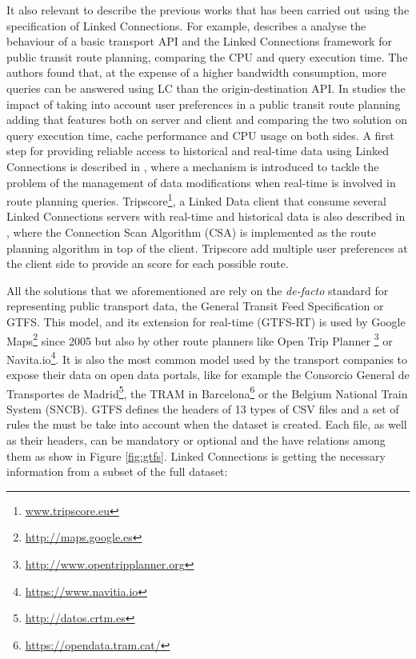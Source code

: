 \documentclass[sw]{iosart2x}
\begin{document}
It also relevant to describe the previous works that has been carried out using the specification of Linked Connections. For example, \cite{colpaert2017public} describes a analyse the behaviour of a basic transport API and the Linked Connections framework for public transit route planning, comparing the CPU and query execution time. The authors found that, at the expense of a higher bandwidth consumption, more queries can be answered using  LC than the origin-destination API. In \cite{colpaert2016impact} studies the impact of taking into account user preferences in a public transit route planning adding that features both on server and client and comparing the two solution on query execution time, cache performance and CPU usage on both sides. A first step for providing reliable access to historical and real-time data using Linked Connections is described in \cite{rojas2017providing}, where a mechanism is introduced to tackle the problem of the management of  data modifications when real-time is involved in route planning queries. Tripscore\footnote{\url{www.tripscore.eu}}, a Linked Data client that consume several Linked Connections servers with real-time and historical data is also described in \cite{ChavesFragaEtAl:DeSemWeb2017}, where the Connection Scan Algorithm (CSA) is implemented as the route planning algorithm in top of the client\cite{dibbelt2013intriguingly}. Tripscore add multiple user preferences at the client side to provide an score for each possible route. 

All the solutions that we aforementioned are rely on the \textit{de-facto} standard for representing public transport data, the General Transit Feed Specification or GTFS. This model, and its extension for real-time (GTFS-RT) is used by Google Maps\footnote{\url{http://maps.google.es}} since 2005 but also by other route planners like Open Trip Planner \footnote{\url{http://www.opentripplanner.org}} or  Navita.io\footnote{\url{https://www.navitia.io}}. It is also the most common model used by the transport companies to expose their data on open data portals, like for example the Consorcio General de Transportes de Madrid\footnote{\url{http://datos.crtm.es}}, the TRAM in Barcelona\footnote{\url{https://opendata.tram.cat/}} or the Belgium National Train System (SNCB). GTFS defines the headers of 13 types of CSV files and a set of rules the must be take into account when the dataset is created. Each file, as well as their headers, can be mandatory or optional and the have relations among them as show in Figure \ref{fig:gtfs}. Linked Connections is getting the necessary information from a subset of the full dataset:
\end{document}
